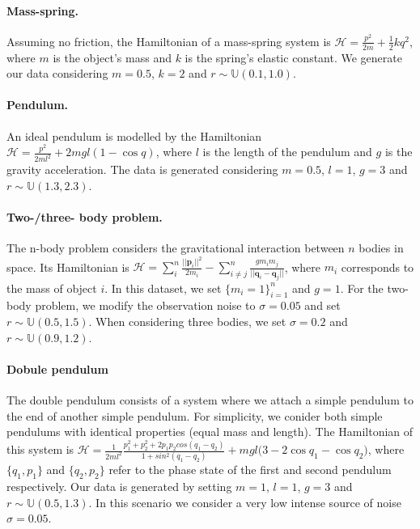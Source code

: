 \paragraph{Mass-spring.} Assuming no friction, the Hamiltonian of a mass-spring system is $\mathcal{H} = \frac{p^2}{2m} + \frac{1}{2}kq^2$, where $m$ is the object's mass and $k$ is the spring's elastic constant.
We generate our data considering
$m=0.5$, $k=2$ and $r \sim \mathbb{U}(0.1, 1.0)$.

\paragraph{Pendulum.} An ideal pendulum is modelled by the Hamiltonian $\mathcal{H} = \frac{p^2}{2ml^2} + 2mgl(1 - \cos q)$, where $l$ is the length of the pendulum and $g$ is the gravity acceleration. The data is generated considering $m=0.5$, $l=1$, $g=3$ and $r \sim \mathbb{U}(1.3, 2.3)$.

\paragraph{Two-/three- body problem.} The n-body problem considers the gravitational interaction between $n$ bodies in space. Its Hamiltonian is $\mathcal{H} = \sum_i^n \frac{||\textbf{p}_i||^2}{2m_i} - \sum_{i\neq j}^n \frac{gm_im_j}{||\textbf{q}_i - \textbf{q}_j||}$, where $m_i$ corresponds to the mass of object $i$. In this dataset, we set $\{m_i = 1\}_{i=1}^n$ and $g=1$. For the two-body problem, we modify the observation noise to $\sigma = 0.05$ and set $r\sim\mathbb{U}(0.5, 1.5)$. When considering three bodies, we set $\sigma=0.2$ and $r\sim\mathbb{U}(0.9, 1.2)$.

\paragraph{Dobule pendulum} The double pendulum consists of a system where we attach a simple pendulum to the end of another simple pendulum. For simplicity, we conider both simple pendulums with identical properties (equal mass and length). The Hamiltonian of this system is $\mathcal{H} = \frac{1}{2ml^2}\frac{p_1^2 + p_2^2 + 2p_1p_2cos(q_1 - q_2)}{1 + sin^2(q_1 - q_2)} + mgl\Big(3 - 2\cos q_1 - \cos q_2\Big)$, where $\{q_1, p_1\}$ and $\{q_2, p_2\}$ refer to the phase state of the first and second pendulum respectively. Our data is generated by setting $m=1$, $l=1$, $g=3$ and $r\sim\mathbb{U}(0.5, 1.3)$. In this scenario we consider a very low intense source of noise $\sigma = 0.05$.

